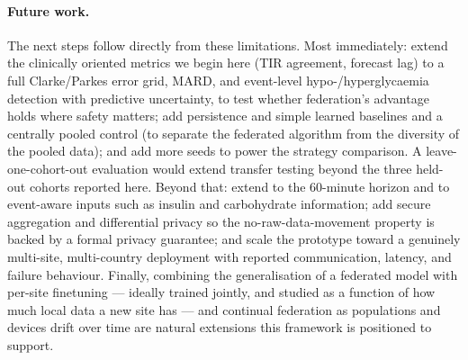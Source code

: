 \documentclass[10pt,letterpaper]{article}
\begin{document}
\paragraph{Future work.} The next steps follow directly from these limitations.
Most immediately: extend the clinically oriented metrics we begin here (TIR
agreement, forecast lag) to a full Clarke/Parkes error grid, MARD, and event-level
hypo-/hyperglycaemia detection with predictive uncertainty, to test whether
federation's advantage holds where safety matters; add persistence and simple
learned baselines and a centrally pooled control (to separate the federated
algorithm from the diversity of the pooled data); and add more seeds to power the
strategy comparison. A leave-one-cohort-out evaluation would extend transfer
testing beyond the three held-out cohorts reported here. Beyond that: extend to the
60-minute horizon and to event-aware inputs such as insulin and carbohydrate
information; add secure aggregation and differential privacy so the
no-raw-data-movement property is backed by a formal privacy guarantee; and scale
the prototype toward a genuinely multi-site, multi-country deployment with
reported communication, latency, and failure behaviour. Finally, combining the
generalisation of a federated model with per-site finetuning --- ideally trained
jointly, and studied as a function of how much local data a new site has --- and
continual federation as populations and devices drift over time are natural
extensions this framework is positioned to support.



\end{document}
